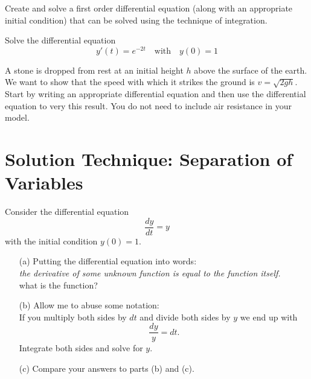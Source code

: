 \begin{problem}
    Create and solve a first order differential equation (along with an appropriate initial
    condition) that can be solved using the technique of integration.
\end{problem}

\begin{problem}
    Solve the differential equation
    \[ y'(t) = e^{-2t} \quad \text{with} \quad y(0) = 1 \]
\end{problem}
\solution{
    \[ y(t) = \int e^{-2t} dt = -\frac{1}{2} e^{-2t} + C \]
    \[ y(0)=1 \implies 1 = -\frac{1}{2} + C \implies C = \frac{3}{2} \implies y(t) =
    -\frac{1}{2} e^{-2t} + \frac{3}{2} \]
}

\begin{problem}
    A stone is dropped from rest at an initial height $h$ above the surface of the earth.
    We want to show that the speed with which it strikes the ground is $v = \sqrt{2gh}$.
    Start by writing an appropriate differential equation and then use the
    differential equation to very this result. You do not need to include air resistance
    in your model.
\end{problem}

\newpage
\section{Solution Technique: Separation of Variables}
\begin{problem}\label{prob:separation_1}
    Consider the differential equation 
    \[ \frac{dy}{dt} = y \]
    with the initial condition $y(0) = 1$.
    \begin{enumerate}
        \item[(a)] Putting the differential equation into words: \\ {\it the derivative of
            some unknown function is equal to the function itself.} \\
            what is the function?
        \item[(b)] Allow me to abuse some notation: \\
            If you multiply both sides by $dt$ and divide both sides by $y$ we end up with
            \[ \frac{dy}{y} = dt. \]
            Integrate both sides and solve for $y$.
        \item[(c)] Compare your answers to parts (b) and (c).
    \end{enumerate}
\end{problem}

